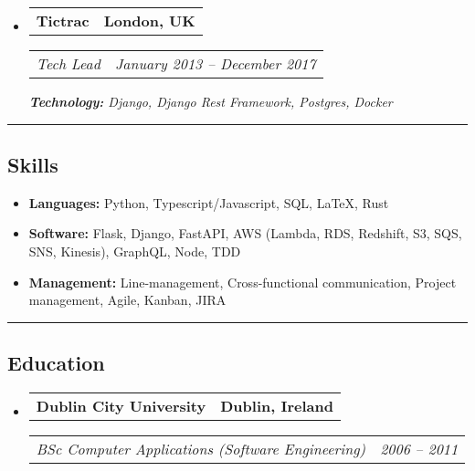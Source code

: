 \documentclass[11pt,letterpaper]{article}
\makeatletter
\newcommand{\headerrow}[2]
{\begin{tabular*}{\linewidth}{l@{\extracolsep{\fill}}r}
#1 &
#2 \\
\end{tabular*}}
\makeatother
\begin{document}
\begin{itemize}[leftmargin=1em]
  \item
        \headerrow
        {\textbf{Tictrac}}
        {\textbf{London, UK}}
        \headerrow
        {\emph{Tech Lead}}
        {\emph{January 2013 -- December 2017}}
        {\emph{\textbf{Technology:} Django, Django Rest Framework, Postgres, Docker}}
\end{itemize}

\hrule
\vspace{-1em}
\subsection*{\Large Skills}

\begin{itemize}[leftmargin=1em,noitemsep]
  \item \textbf{Languages:}
        Python, Typescript/Javascript, SQL, \LaTeX, Rust
  \item \textbf{Software:}
        Flask, Django, FastAPI, AWS (Lambda, RDS, Redshift, S3, SQS, SNS, Kinesis), GraphQL, Node, TDD
  \item \textbf{Management:}
        Line-management, Cross-functional communication, Project management, Agile, Kanban, JIRA
\end{itemize}

\hrule
\vspace{-1em}
\subsection*{\Large Education}

\begin{itemize}[leftmargin=1em]
  \parskip=0.1em

  \item
        \headerrow
        {\textbf{Dublin City University}}
        {\textbf{Dublin, Ireland}}
        \headerrow
        {\emph{BSc Computer Applications (Software Engineering)}}
        {\emph{2006 -- 2011 }}


\end{itemize}
\end{document}
